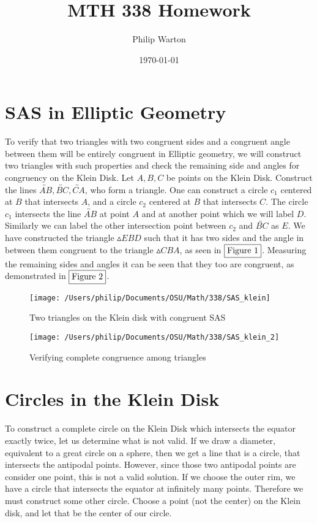 \documentclass{article}
\begin{document}
\title{MTH 338 Homework}
\author{Philip Warton}
\date{\today}
\maketitle
\section{SAS in Elliptic Geometry}
To verify that two triangles with two congruent sides and a congruent angle between them will be entirely congruent in Elliptic geometry, we will construct two triangles with such properties and check the remaining side and angles for congruency on the Klein Disk. Let $A,B,C$ be points on the Klein Disk. Construct the lines $\overleftrightarrow{AB}, \overleftrightarrow{BC}, \overleftrightarrow{CA}$, who form a triangle. One can construct a circle $c_1$ centered at $B$ that intersects $A$, and a circle $c_2$ centered at $B$ that intersects $C$. The circle $c_1$ intersects the line $\overleftrightarrow{AB}$ at point $A$ and at another point which we will label $D$. Similarly we can label the other intersection point between $c_2$ and $\overleftrightarrow{BC}$ as $E$. We have constructed the triangle $\vartriangle EBD$ such that it has two sides and the angle in between them congruent to the triangle $\vartriangle CBA$, as seen in $\fbox{Figure 1}$. Measuring the remaining sides and angles it can be seen that they too are congruent, as demonstrated in $\fbox{Figure 2}$.
\begin{figure}
	\caption{Two triangles on the Klein disk with congruent SAS}
	\texttt{[image: /Users/philip/Documents/OSU/Math/338/SAS\_klein]}
\end{figure}
\begin{figure}
	\caption{Verifying complete congruence among triangles}
	\texttt{[image: /Users/philip/Documents/OSU/Math/338/SAS\_klein\_2]}
\end{figure}
\section{Circles in the Klein Disk}
	To construct a complete circle on the Klein Disk which intersects the equator exactly twice, let us determine what is not valid. If we draw a diameter, equivalent to a great circle on a sphere, then we get a line that is a circle, that intersects the antipodal points. However, since those two antipodal points are consider one point, this is not a valid solution. If we choose the outer rim, we have a circle that intersects the equator at infinitely many points. Therefore we must construct some other circle. Choose a point (not the center) on the Klein disk, and let that be the center of our circle. 
\end{document}
